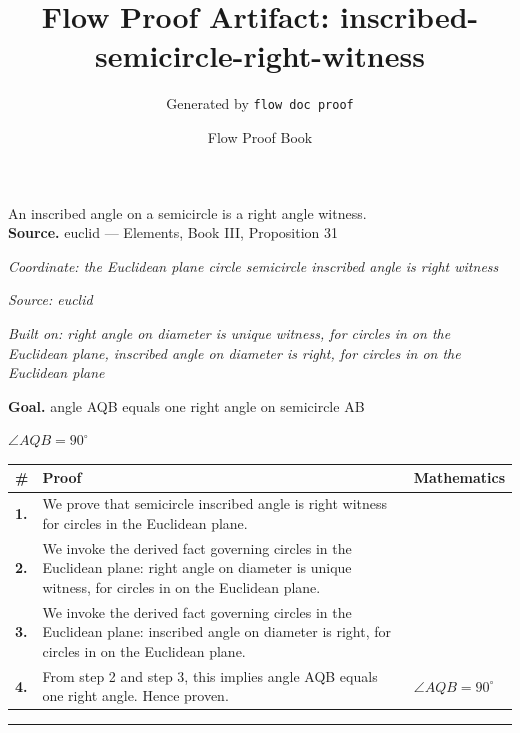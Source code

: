\documentclass[11pt]{article}
\title{Flow Proof Artifact: inscribed-semicircle-right-witness}
\author{Generated by \texttt{flow doc proof}}
\date{Flow Proof Book}
\theoremstyle{definition}
\begin{document}
\maketitle
An inscribed angle on a semicircle is a right angle witness.\\[0.5em]
\textbf{Source.} euclid — Elements, Book III, Proposition 31\\[0.5em]
\bigskip
{}\par
\smallskip\noindent\textit{Coordinate: the Euclidean plane \cdot circle \cdot semicircle inscribed angle is right witness}\par
\smallskip\noindent\textit{Source: euclid}\par
\smallskip\noindent\textit{Built on: right angle on diameter is unique witness, for circles in on the Euclidean plane, inscribed angle on diameter is right, for circles in on the Euclidean plane}\par
\medskip
\noindent\textbf{Goal.} angle AQB equals one right angle on semicircle AB\par
\noindent$\displaystyle \angle AQB = 90^\circ$\par
\medskip
\noindent
\begin{tabular}{@{} >{\raggedright\arraybackslash}p{} >{\raggedright\arraybackslash}p{} >{\raggedleft\arraybackslash}p{} @{}}
\textbf{\#} & \textbf{Proof} & \textbf{Mathematics} \\
\midrule
\textbf{1.} & We prove that semicircle inscribed angle is right witness for circles in the Euclidean plane. & \\[0.45em]
\textbf{2.} & We invoke the derived fact governing circles in the Euclidean plane: right angle on diameter is unique witness, for circles in on the Euclidean plane. & \\[0.45em]
\textbf{3.} & We invoke the derived fact governing circles in the Euclidean plane: inscribed angle on diameter is right, for circles in on the Euclidean plane. & \\[0.45em]
\textbf{4.} & From step 2 and step 3, this implies angle AQB equals one right angle. Hence proven. & $\displaystyle \angle AQB = 90^\circ$ \\[0.45em]
\bottomrule
\end{tabular}
\label{thm:Geometry-circle-semicircle_inscribed_angle_is_right_witness}
\par\medskip\hrule
\end{document}
